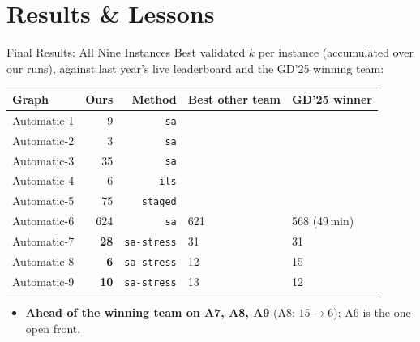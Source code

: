 \section{Results \& Lessons}

\begin{frame}{Final Results: All Nine Instances}
  Best validated $k$ per instance (accumulated over our runs), against last year's
  live leaderboard and the GD'25 winning team:
  \begin{center}
    \footnotesize
    \begin{tabular}{lrrll}
      \toprule
      \textbf{Graph} & \textbf{Ours} & \textbf{Method} & \textbf{Best other team} & \textbf{GD'25 winner} \\
      \midrule
      Automatic-1 & 9   & \texttt{sa}        &      &      \\
      Automatic-2 & 3   & \texttt{sa}        &      &      \\
      Automatic-3 & 35  & \texttt{sa}        &      &      \\
      Automatic-4 & 6   & \texttt{ils}       &      &      \\
      Automatic-5 & 75  & \texttt{staged}    &      &      \\
      Automatic-6 & 624 & \texttt{sa}        & 621  & 568 (49\,min) \\
      Automatic-7 & \textbf{28}  & \texttt{sa-stress} & 31   & 31   \\
      Automatic-8 & \textbf{6}   & \texttt{sa-stress} & 12   & 15   \\
      Automatic-9 & \textbf{10}  & \texttt{sa-stress} & 13   & 12   \\
      \bottomrule
    \end{tabular}
  \end{center}
  \smallskip
  \begin{itemize}
    \item \textbf{Ahead of the winning team on A7, A8, A9} (A8: $15 \to 6$);
          A6 is the one open front.
  \end{itemize}
\end{frame}

